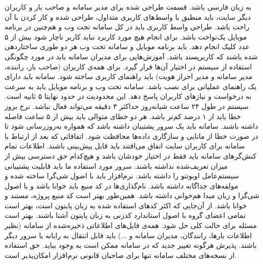 \newpage
{}

	 
	
		 به زبان فارسی باشد.
		 قسمت طراحی شده برای مدیر سامانه و صاحب بار و کاربران دیگر سایت، باید منطبق با واسط‌های کاربری متداول، طراحی شده و کار کردن با آن راحت باشد.
		 طراحی واسط کاربری باید در کل سامانه تحت وب و هم‌چنین در برنامه موبایل یک‌نواخت باشد.
		 برای انجام هیچ مورد کاربرد نباید کاربر ناچار شود بیش از ۵ عدد کلیک انجام دهد.
		 باید برنامه موبایل و سامانه تحت وب هر دو طوری ساختاردهی شده باشند که کاربرپسند باشد.
	 
		 آموزش‌هایی برای مدیران سامانه باید در مورد چگونگی استفاده از سیستم در اختیار آن‌ها قرار گیرد.
		 برای همه‌ی کاربران‌ (صاحب بار، راننده، مدیر سامانه و مدیر احراز هویت) باید راهنمای کاربری ساخته شود.
		 سامانه باید دارای یک راهنمای عملیاتی برای نصب باشد.
	 
		 سامانه تحت وب و برنامه موبایل باید به سرعت به درخواست و نیازهای کاربران پاسخ دهد. این محدودیت در حدود نهایتا ۵ ثانیه است.
	 
		 سیستم در طول ۲۴ ساعت شبانه‌روز حداکثر ۳ دقیقه می‌تواند فعال نباشد.
		 نرخ بروز خطا باید از ۱ درصد کم‌تر باشد.
		 هر دو خطای متوالی باید بیش از ۵ ساعت فاصله داشته باشند.
		 سامانه باید یک سرور پشتیبان داشته باشد که همواره به‌روزرسانی شود تا در صورت خطا از مانایی و سازگاری داده‌ها محافظت شود.
		 اتفاقاتی که بعد از ارتباط با سامانه برای کاربران سایت اتفاق می‌افتند باید قابل پیش‌بینی باشند.
	 
		 اطلاعات تمام کنش‌گرهای سامانه باید فقط در اختیار خودشان باشد و هیچ‌کدام حق دسترسی بیش از میزان تعریف‌شده نداشته باشند.
	 
		 سرور مورد استفاده ما باید قابلیت پشتیبانی سیستم‌عامل اوبونتو را داشته باشد.
	 
		 نرم‌افزار باید با اصول شی‌گرا ساخته شده و مولفه‌های جداگانه داشته باشد.
		 نام‌گذاری‌ها در کد منبع باید خوانا باشد و با اصول شی‌گرا و زبان مبدا هم‌خوانی داشته باشد. همین‌طور بهتر است کد منبع پروژه، مستند و خوانا باشد.
		 از آن‌جایی که اکثر کدهای استفاده شده به زبان پایتون است، بهتر است تمامی اعضای گروه با اصول استاندارد کدزنی به زبان پایتون آشنا باشند.
	 
		 بهتر است مسئله برای حالت کلی حل شود.
	 
		 همه‌ی فایل‌های اطلاعاتی ذخیره‌شده از سامانه (نظیر اطلاعات بارها، رانندگان، مدیران سامانه و ...) باید قابل انتقال به رایانه یا سرور دیگر باشند.
	 
		 پذیرش هرگونه تغییر جدید که در سامانه ممکن است به وجود بیاید.
	 
		 حق استفاده از نسخه‌های مختلف سامانه تنها برای صاحبان قانونی نرم‌افزار امکان‌پذیر است.
